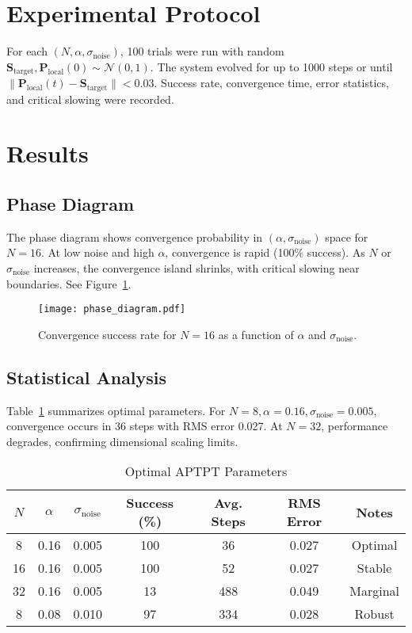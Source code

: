 \documentclass[12pt]{article}
\begin{document}
\section{Experimental Protocol}
For each $(N, \alpha, \sigma_{\text{noise}})$, 100 trials were run with random $\mathbf{S}_{\text{target}}, \mathbf{P}_{\text{local}}(0) \sim \mathcal{N}(0,1)$. The system evolved for up to 1000 steps or until $\|\mathbf{P}_{\text{local}}(t) - \mathbf{S}_{\text{target}}\| < 0.03$. Success rate, convergence time, error statistics, and critical slowing were recorded.

\section{Results}
\subsection{Phase Diagram}
The phase diagram shows convergence probability in $(\alpha, \sigma_{\text{noise}})$ space for $N=16$. At low noise and high $\alpha$, convergence is rapid (100\% success). As $N$ or $\sigma_{\text{noise}}$ increases, the convergence island shrinks, with critical slowing near boundaries. See Figure~\ref{fig:phasediag}.

\begin{figure}[H]
\centering
\texttt{[image: phase\_diagram.pdf]}
\caption{Convergence success rate for $N=16$ as a function of $\alpha$ and $\sigma_{\text{noise}}$.}
\label{fig:phasediag}
\end{figure}

\subsection{Statistical Analysis}
Table~\ref{tab:params} summarizes optimal parameters. For $N=8, \alpha=0.16, \sigma_{\text{noise}}=0.005$, convergence occurs in 36 steps with RMS error 0.027. At $N=32$, performance degrades, confirming dimensional scaling limits.

\begin{table}[H]
\centering
\caption{Optimal APTPT Parameters}
\begin{tabular}{ccccccc}
\toprule
$N$ & $\alpha$ & $\sigma_{\text{noise}}$ & Success (\%) & Avg. Steps & RMS Error & Notes \\
\midrule
8 & 0.16 & 0.005 & 100 & 36 & 0.027 & Optimal \\
16 & 0.16 & 0.005 & 100 & 52 & 0.027 & Stable \\
32 & 0.16 & 0.005 & 13 & 488 & 0.049 & Marginal \\
8 & 0.08 & 0.010 & 97 & 334 & 0.028 & Robust \\
\bottomrule
\end{tabular}
\label{tab:params}
\end{table}
\end{document}
